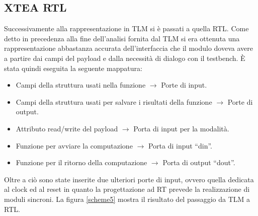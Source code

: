 \documentclass[]{IEEEtran}
\begin{document}
\subsection{XTEA RTL}
Successivamente alla rappresentazione in TLM si è passati a quella RTL. Come detto in precedenza alla fine dell'analisi fornita dal TLM si era ottenuta una rappresentazione abbastanza accurata dell'interfaccia che il modulo doveva avere a partire dai campi del payload e dalla necessità di dialogo con il testbench. È stata quindi eseguita la seguente mappatura:
\begin{itemize}
	\item Campi della struttura usati nella funzione $\rightarrow$ Porte di input.
	\item Campi della struttura usati per salvare i risultati della funzione $\rightarrow$ Porte di output.
	\item Attributo read/write del payload $\rightarrow$ Porta di input per la modalità.
	\item Funzione per avviare la computazione $\rightarrow$ Porta di input ``din''.
	\item Funzione per il ritorno  della computazione  $\rightarrow$ Porta di output ``dout''.
\end{itemize}
Oltre a ciò sono state inserite due ulteriori porte di input, ovvero quella dedicata al clock ed al reset in quanto la progettazione ad RT prevede la realizzazione di moduli sincroni. La figura \ref{scheme5} mostra il risultato del passaggio da TLM a RTL. 
\end{document}
